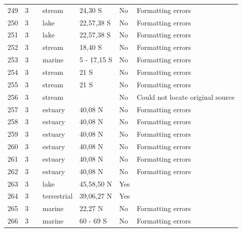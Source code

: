 \documentclass[12pt]{article}
\begin{document}
\begin{landscape}
\begin{table}[h!]
{\begin{tabular}{p{2.8cm}p{1.3cm}p{3cm}p{2.2cm}p{2.5cm}lp{8.2cm}}
        249   & 3 & \cite{Angelini2005}  & stream & 24,30 S & No  &  Formatting errors     \\
        250   & 3 & \cite{Angelini2006}  & lake  & 22,57,38 S & No  &  Formatting errors     \\
        251   & 3 & \cite{Angelini2006}  & lake  & 22,57,38 S & No  &  Formatting errors     \\
        252   & 3 & \cite{Angelini2010}  & stream & 18,40 S & No  &  Formatting errors     \\
        253   & 3 & \cite{Angelini2011}  & marine & 5 - 17,15 S & No  &  Formatting errors     \\
        254   & 3 & \cite{Angelini2013}  & stream & 21 S  & No  &  Formatting errors     \\
        255   & 3 & \cite{Angelini2013}  & stream & 21 S  & No  &  Formatting errors     \\
        256   & 3 & \cite{Angelini2013}  & stream &       & No    & Could not locate original source \\
        257   & 3 & \cite{Baeta2011}  & estuary & 40,08 N & No  &  Formatting errors     \\
        258   & 3 & \cite{Baeta2011}  & estuary & 40,08 N & No  &  Formatting errors     \\
        259   & 3 & \cite{Baeta2011}  & estuary & 40,08 N & No  &  Formatting errors     \\
        260   & 3 & \cite{Baeta2011}  & estuary & 40,08 N & No  &  Formatting errors     \\
        261   & 3 & \cite{Baeta2011}  & estuary & 40,08 N & No  &  Formatting errors     \\
        262   & 3 & \cite{Baeta2011}  & estuary & 40,08 N & No  &  Formatting errors     \\
        263   & 3 & \cite{Schneider1997}    & lake  & 45,58,50 N & Yes   &       \\
        264   & 3 & \cite{Stagliano2002}    & terrestrial & 39,06,27 N & Yes   &       \\
        265   & 3 & \cite{Lin2006}  & marine & 22,27 N & No  &  Formatting errors     \\
        266   & 3 & \cite{Cornejo-Donoso2008}  & marine & 60 - 69 S & No  &  Formatting errors     \\
         \hline
      \end{tabular}}%
      \end{table}

        \newpage


\end{landscape}
\end{document}
